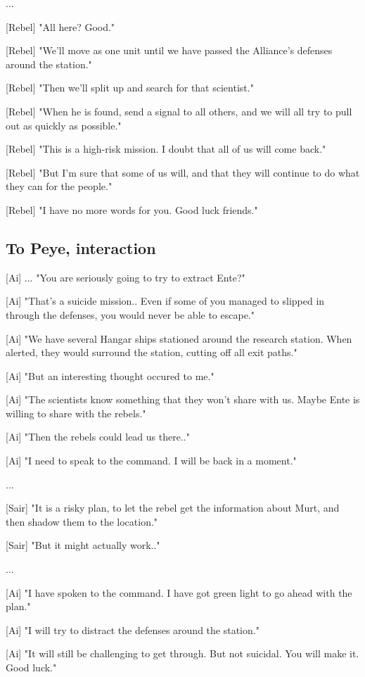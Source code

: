 \documentclass[a4paper,12pt]{article}
\begin{document}
...

[Rebel] "All here? Good." 

[Rebel] "We'll move as one unit until we have passed the Alliance's defenses around the station."

[Rebel] "Then we'll split up and search for that scientist." 

[Rebel] "When he is found, send a signal to all others, and we will all try to pull out as quickly as possible."

[Rebel] "This is a high-risk mission. I doubt that all of us will come back."

[Rebel] "But I'm sure that some of us will, and that they will continue to do what they can for the people."

[Rebel] "I have no more words for you. Good luck friends."

\subsection{To Peye, interaction}

[Ai] ... "You are seriously going to try to extract Ente?" 

[Ai] "That's a suicide mission.. Even if some of you managed to slipped in through
the defenses, you would never be able to escape." 

[Ai] "We have several Hangar ships stationed around the research station. When alerted, they would surround
the station, cutting off all exit paths."

[Ai] "But an interesting thought occured to me." 

[Ai] "The scientists know something that they won't share with us. Maybe Ente is willing to share with the rebels."

[Ai] "Then the rebels could lead us there.."

[Ai] "I need to speak to the command. I will be back in a moment."

...

[Sair] "It is a risky plan, to let the rebel get the information about Murt, and then shadow them to
the location."

[Sair] "But it might actually work.."

...

[Ai] "I have spoken to the command. I have got green light to go ahead with the plan."

[Ai] "I will try to distract the defenses around the station."

[Ai] "It will still be challenging to get through. But not suicidal. You will make it. Good luck."
\end{document}
